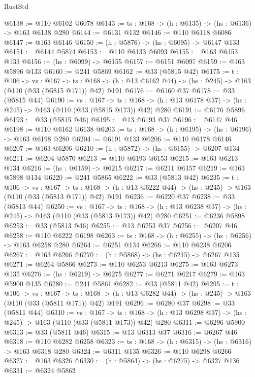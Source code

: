 \begin{lexlean}{RustStd}
\begin{coremodule}
@6138 := @110 @6102 @6078
@6143 := {ts : @168} -> (h : @6135) -> (hs : @6136) -> @163 @6138 @280
@6144 := @6131 @132
@6146 := @110 @6118 @6086
@6147 := @163 @6146
@6150 := (h : @5876) -> (hs : @6095) -> @6147 @133
@6151 := @6144 @5874
@6153 := @110 @6133 @6093
@6155 := @163 @6153 @133
@6156 := (hs : @6099) -> @6155
@6157 := @6151 @6097
@6159 := @163 @5896 @133
@6160 := @241 @5869
@6162 := @33 (@5815 @42)
@6175 := {t : @106} ->
  {vs : @167} ->
  {ts : @168} -> (h : @13 @6162 @44) -> (hs : @245) -> @163 (@110 (@33 (@5815 @171)) @42) @191
@6176 := @6160 @37
@6178 := @33 (@5815 @44)
@6190 := {vs : @167} ->
  {ts : @168} -> (h : @13 @6178 @37) -> (hs : @245) -> @163 (@110 (@33 (@5815 @173)) @42) @280
@6191 := @6176 @5896
@6193 := @33 (@5815 @46)
@6195 := @13 @6193 @37
@6196 := @6147 @46
@6198 := @110 @6162 @6138
@6203 := {ts : @168} -> (h : @6195) -> (hs : @6196) -> @163 @6198 @280
@6204 := @6191 @133
@6206 := @110 @6178 @6146
@6207 := @163 @6206
@6210 := (h : @5872) -> (hs : @6155) -> @6207 @134
@6211 := @6204 @5870
@6213 := @110 @6193 @6153
@6215 := @163 @6213 @134
@6216 := (hs : @6159) -> @6215
@6217 := @6211 @6157
@6219 := @163 @5898 @134
@6220 := @241 @5865
@6222 := @33 (@5813 @42)
@6235 := {t : @106} ->
  {vs : @167} ->
  {ts : @168} -> (h : @13 @6222 @44) -> (hs : @245) -> @163 (@110 (@33 (@5813 @171)) @42) @191
@6236 := @6220 @37
@6238 := @33 (@5813 @44)
@6250 := {vs : @167} ->
  {ts : @168} -> (h : @13 @6238 @37) -> (hs : @245) -> @163 (@110 (@33 (@5813 @173)) @42) @280
@6251 := @6236 @5898
@6253 := @33 (@5813 @46)
@6255 := @13 @6253 @37
@6256 := @6207 @46
@6258 := @110 @6222 @6198
@6263 := {ts : @168} -> (h : @6255) -> (hs : @6256) -> @163 @6258 @280
@6264 := @6251 @134
@6266 := @110 @6238 @6206
@6267 := @163 @6266
@6270 := (h : @5868) -> (hs : @6215) -> @6267 @135
@6271 := @6264 @5866
@6273 := @110 @6253 @6213
@6275 := @163 @6273 @135
@6276 := (hs : @6219) -> @6275
@6277 := @6271 @6217
@6279 := @163 @5900 @135
@6280 := @241 @5861
@6282 := @33 (@5811 @42)
@6295 := {t : @106} ->
  {vs : @167} ->
  {ts : @168} -> (h : @13 @6282 @44) -> (hs : @245) -> @163 (@110 (@33 (@5811 @171)) @42) @191
@6296 := @6280 @37
@6298 := @33 (@5811 @44)
@6310 := {vs : @167} ->
  {ts : @168} -> (h : @13 @6298 @37) -> (hs : @245) -> @163 (@110 (@33 (@5811 @173)) @42) @280
@6311 := @6296 @5900
@6313 := @33 (@5811 @46)
@6315 := @13 @6313 @37
@6316 := @6267 @46
@6318 := @110 @6282 @6258
@6323 := {ts : @168} -> (h : @6315) -> (hs : @6316) -> @163 @6318 @280
@6324 := @6311 @135
@6326 := @110 @6298 @6266
@6327 := @163 @6326
@6330 := (h : @5864) -> (hs : @6275) -> @6327 @136
@6331 := @6324 @5862

\end{coremodule}
\end{lexlean}
